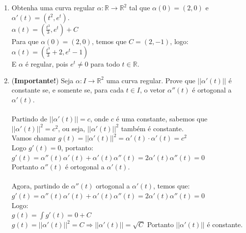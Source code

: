 \documentclass{article}
\begin{document}
\begin{enumerate}
    \item Obtenha uma curva regular $\alpha : \mathbb{R} \to \mathbb{R}^2$ tal que $\alpha(0) = (2, 0)$ e $\alpha'(t) = (t^2, e^t)$. \
        \\
        $\alpha(t) = (\frac{t^3}{3}, e^t) + C$ \\
        Para que $\alpha(0) = (2, 0)$, temos que $C = (2, -1)$, logo: \\
        $\alpha(t) = (\frac{t^3}{3} + 2, e^t - 1)$ \\
        E $\alpha$ é regular, pois $e^t \neq 0$ para todo $t \in \mathbb{R}$. \
    \item (\textbf{Importante!}) Seja $\alpha : I \to \mathbb{R}^2$ uma curva regular. Prove que $||\alpha'(t)||$ é constante se, e somente se, para cada $t \in I$, o vetor $\alpha''(t)$ é ortogonal a $\alpha'(t)$. \\
        \\
        Partindo de $||\alpha'(t)|| = c$, onde $c$ é uma constante, sabemos que $||\alpha'(t)||^2 = c^2$, ou seja, $||\alpha'(t)||^2$ também é constante. \\
        Vamos chamar $g(t) = ||\alpha'(t)||^2 = \alpha'(t) \cdot \alpha'(t) = c^2$ \\
        Logo $g'(t) = 0$, portanto: \\
        $g'(t) = \alpha''(t)\alpha'(t) + \alpha'(t)\alpha''(t) = 2\alpha'(t)\alpha''(t) = 0$ \\
        Portanto $\alpha''(t)$ é ortogonal a $\alpha'(t)$. \\
        \\
        Agora, partindo de $\alpha''(t)$ ortogonal a $\alpha'(t)$, temos que: \\
        $g'(t) = \alpha''(t)\alpha'(t) + \alpha'(t)\alpha''(t) = 2\alpha'(t)\alpha''(t) = 0$ \\
        Logo:\\
        $g(t) = \int g'(t) = 0 + C$ \\
        $g(t) = ||\alpha'(t)||^2 = C \Rightarrow ||\alpha'(t)|| = \sqrt{C}$
        Portanto $||\alpha'(t)||$ é constante. \\


\end{enumerate}
\end{document}
